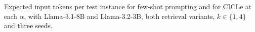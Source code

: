 \begin{table}[t]
  \centering
  \small
  \setlength{\tabcolsep}{4pt}
  
  \caption{Expected input tokens per test instance for few-shot prompting and for CICLe at each $\alpha$, with Llama-3.1-8B and Llama-3.2-3B, both retrieval variants, $k \in \{1, 4\}$ and three seeds.}
  \label{tab:cost_alpha}
\end{table}
